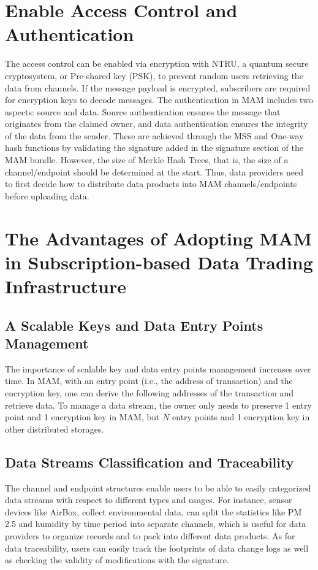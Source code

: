 \begin{spacing}{2.0}
\section{Enable Access Control and Authentication}
\label{section:mam_functions}
The access control can be enabled via encryption with NTRU\cite{NTRU}, a quantum secure cryptosystem, or Pre-shared key (PSK), to prevent random users retrieving the data from channels. If the message payload is encrypted, subscribers are required for encryption keys to decode messages. The authentication in MAM includes two aspects: source and data. Source authentication ensures the message that originates from the claimed owner, and data authentication ensures the integrity of the data from the sender. These are achieved through the MSS and One-way hash functions by validating the signature added in the signature section of the MAM bundle. However, the size of Merkle Hash Trees, that is, the size of a channel/endpoint should be determined at the start. Thus, data providers need to first decide how to distribute data products into MAM channels/endpoints before uploading data.

\section{The Advantages of Adopting MAM in Subscription-based Data Trading Infrastructure}
\label{section:mam_features}
\subsection{A Scalable Keys and Data Entry Points Management}
The importance of scalable key and data entry points management increases over time. In MAM, with an entry point (i.e., the address of transaction) and the encryption key, one can derive the following addresses of the transaction and retrieve data. To manage a data stream, the owner only needs to preserve 1 entry point and 1 encryption key in MAM, but $N$ entry points and 1 encryption key in other distributed storages.
\clearpage

\subsection{Data Streams Classification and Traceability}
The channel and endpoint structures enable users to be able to easily categorized data streams with respect to different types and usages. For instance, sensor devices like AirBox\cite{LASS}, collect environmental data, can split the statistics like PM 2.5 and humidity by time period into separate channels, which is useful for data providers to organize records and to pack into different data products. As for data traceability, users can easily track the footprints of data change logs as well as checking the validity of modifications with the signature.


\end{spacing}
